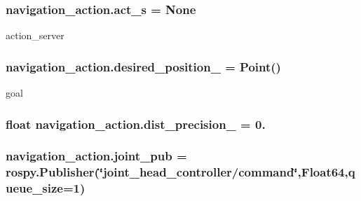 \subsubsection[{\texorpdfstring{act\+\_\+s}{act_s}}]{\setlength{\rightskip}{0pt plus 5cm}navigation\+\_\+action.\+act\+\_\+s = None}\hypertarget{namespacenavigation__action_a0ff6186f4b199de2bb1fff9bdd2ad110}{}\label{namespacenavigation__action_a0ff6186f4b199de2bb1fff9bdd2ad110}


action\+\_\+server 

\subsubsection[{\texorpdfstring{desired\+\_\+position\+\_\+}{desired_position_}}]{\setlength{\rightskip}{0pt plus 5cm}navigation\+\_\+action.\+desired\+\_\+position\+\_\+ = Point()}\hypertarget{namespacenavigation__action_a7ce69adc83a1ee3d37d5e3c6e0e72e32}{}\label{namespacenavigation__action_a7ce69adc83a1ee3d37d5e3c6e0e72e32}


goal 

\subsubsection[{\texorpdfstring{dist\+\_\+precision\+\_\+}{dist_precision_}}]{\setlength{\rightskip}{0pt plus 5cm}float navigation\+\_\+action.\+dist\+\_\+precision\+\_\+ = 0.}\hypertarget{namespacenavigation__action_ae84ae6794723578c0bda3eb07d0f1387}{}\label{namespacenavigation__action_ae84ae6794723578c0bda3eb07d0f1387}
\subsubsection[{\texorpdfstring{joint\+\_\+pub}{joint_pub}}]{\setlength{\rightskip}{0pt plus 5cm}navigation\+\_\+action.\+joint\+\_\+pub = rospy.\+Publisher(\char`\"{}joint\+\_\+head\+\_\+controller/command\char`\"{},Float64,queue\+\_\+size=1)}\hypertarget{namespacenavigation__action_a0d7ef71fc2d73b266e305aaca8a1330a}{}\label{namespacenavigation__action_a0d7ef71fc2d73b266e305aaca8a1330a}


